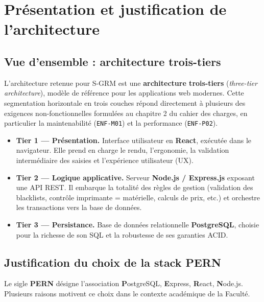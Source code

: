 \documentclass[a4paper,11pt,openany]{report}
\begin{document}
\chapter{Présentation et justification de l'architecture}

\section{Vue d'ensemble : architecture trois-tiers}

L'architecture retenue pour S-GRM est une \textbf{architecture
trois-tiers} (\emph{three-tier architecture}), modèle de
référence pour les applications web modernes. Cette segmentation
horizontale en trois couches répond directement à plusieurs des
exigences non-fonctionnelles formulées au chapitre 2 du cahier
des charges, en particulier la maintenabilité (\texttt{ENF-M01})
et la performance (\texttt{ENF-P02}).

\begin{itemize}
  \item \textbf{Tier 1 --- Présentation.} Interface utilisateur
    en \textbf{React}, exécutée dans le navigateur. Elle prend
    en charge le rendu, l'ergonomie, la validation
    intermédiaire des saisies et l'expérience utilisateur (UX).
  \item \textbf{Tier 2 --- Logique applicative.} Serveur
    \textbf{Node.js / Express.js} exposant une API REST. Il
    embarque la totalité des règles de gestion (validation des
    blacklists, contrôle imprimante = matérielle, calculs de
    prix, etc.) et orchestre les transactions vers la base de
    données.
  \item \textbf{Tier 3 --- Persistance.} Base de données
    relationnelle \textbf{PostgreSQL}, choisie pour la richesse
    de son SQL et la robustesse de ses garanties ACID.
\end{itemize}

\section{Justification du choix de la stack PERN}

Le sigle \textbf{PERN} désigne l'association
\textbf{P}ostgreSQL, \textbf{E}xpress, \textbf{R}eact,
\textbf{N}ode.js. Plusieurs raisons motivent ce choix dans le
contexte académique de la Faculté.
\end{document}
